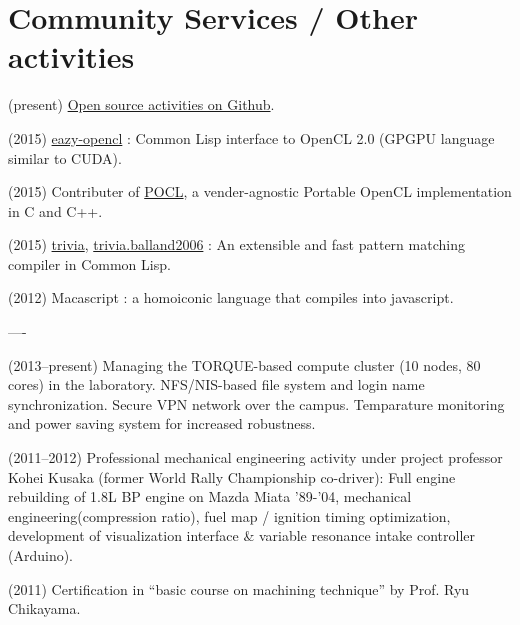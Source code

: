 \documentclass[letterpaper,12pt]{article}
\begin{document}
\section{Community Services / Other activities}

(present) \href{https://github.com/guicho271828}{Open source activities on Github}.

(2015) \href{https://github.com/guicho271828/eazy-opencl}{eazy-opencl}
: Common Lisp interface to OpenCL 2.0 (GPGPU language similar to CUDA).

(2015) Contributer of \href{https://github.com/pocl/pocl}{POCL},
a vender-agnostic Portable OpenCL implementation in C and C++.

(2015) \href{https://github.com/guicho271828/trivia}{trivia},
\href{https://github.com/guicho271828/trivia.balland2006}{trivia.balland2006}
: An extensible and fast pattern matching compiler in Common Lisp.

(2012) Macascript : a homoiconic language that compiles into javascript.

----

(2013--present)
 Managing the TORQUE-based compute cluster (10 nodes, 80 cores) in the laboratory.
 NFS/NIS-based file system and login name synchronization.
 Secure VPN network over the campus.
 Temparature monitoring and power saving system for increased robustness.

(2011--2012) Professional mechanical engineering
 activity under project professor Kohei Kusaka (former World Rally
 Championship co-driver):
 Full engine rebuilding of 1.8L BP engine on Mazda Miata '89-'04,
 mechanical engineering(compression ratio),
 fuel map / ignition timing optimization, development of visualization
 interface \& variable resonance intake controller (Arduino).

(2011) Certification in ``basic course on machining technique'' by Prof. Ryu Chikayama.

\end{document}
